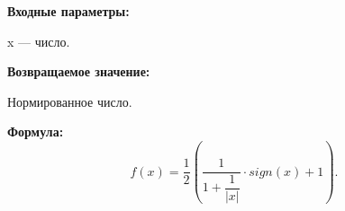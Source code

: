 \textbf{Входные параметры:}

 x --- число.

\textbf{Возвращаемое значение:}
 
Нормированное число.
 
\textbf{Формула:}
\begin{equation*}
f\left(x \right)=\frac{1}{2}\left( \dfrac{1}{1+\dfrac{1}{\left| x\right| }}\cdot sign \left( x\right)+1 \right) .
\end{equation*}